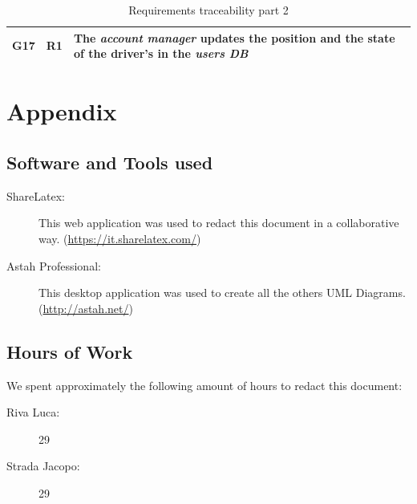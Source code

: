 \documentclass[a4paper]{article}
\begin{document}
\begin{table} [H]
\begin{center}
\begin{tabular}{ |M|M|m{\customTableWidth}|  }
    \hline
    \hline

    \textbf{G17} & \textbf{R1} & The \textit{account manager} updates the position and the state of the driver's in the \textit{users DB}\\
    
    \hline


        

\end{tabular}
\end{center}
\label{table:requirementsTraceabilityPt2}
\caption{Requirements traceability part 2}
\end{table}

\section{Appendix}

\subsection{Software and Tools used}

\begin{description}
\item[ShareLatex:] This web application was used to redact this document in a collaborative way. 
\newline (\url{https://it.sharelatex.com/})
\item[Astah Professional:] This desktop application was used to create all the others UML Diagrams.
\newline (\url{http://astah.net/})
\end{description}

\subsection{Hours of Work}
We spent approximately the following amount of hours to redact this document:
\begin{description}
\item[Riva Luca:] 29
\item[Strada Jacopo:] 29
\end{description}
\end{document}
